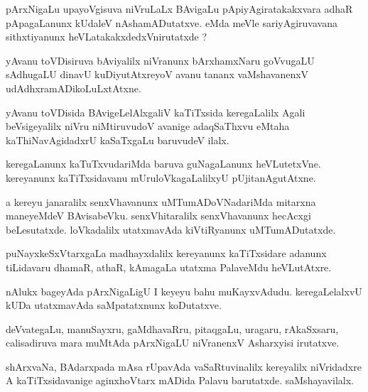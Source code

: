\documentclass{article}
\begin{document}
\begin{mn}%
pArxNigaLu upayoVgisuva niVruLaLx BAvigaLu pApiyAgiratakakxvara adhaR pApagaLanunx kUdaleV 
nAshamADutatxve. eMda meVle sariyAgiruvavana sithxtiyanunx heVLatakakxdedxVnirutatxde ?
\end{mn}

\begin{mn}%
yAvanu toVDisiruva bAviyalilx niVranunx bArxhamxNaru goVvugaLU sAdhugaLU dinavU kuDiyutAtxreyoV avanu 
tananx vaMshavanenxV udAdhxramADikoLuLxtAtxne.
\end{mn}

\begin{mn}%
yAvanu toVDisida BAvigeLelAlxgaliV kaTiTxsida keregaLalilx Agali beVsigeyalilx niVru niMtiruvudoV 
avanige adaqSaThxvu eMtaha kaThiNavAgidadxrU kaSaTxgaLu baruvudeV ilalx.
\end{mn}

\begin{mn}%
keregaLanunx kaTuTxvudariMda baruva guNagaLanunx heVLutetxVne. kereyanunx kaTiTxsidavanu 
mUruloVkagaLalilxyU pUjitanAgutAtxne.
\end{mn}

\begin{mn}%
a kereyu janaralilx senxVhavanunx uMTumADoVNadariMda mitarxna maneyeMdeV BAvisabeVku. 
senxVhitaralilx senxVhavanunx hecAcxgi beLesutatxde. loVkadalilx utatxmavAda kiVtiRyanunx 
uMTumADutatxde.
\end{mn}

\begin{mn}%
puNayxkeSxVtarxgaLa madhayxdalilx kereyanunx kaTiTxsidare adanunx tiLidavaru dhamaR, athaR, kAmagaLa 
utatxma PalaveMdu heVLutAtxre.
\end{mn}

\begin{mn}%
nAlukx bageyAda pArxNigaLigU I keyeyu bahu muKayxvAdudu. keregaLelalxvU kUDa utatxmavAda 
saMpatatxnunx koDutatxve.
\end{mn}

\begin{mn}%
deVvategaLu, manuSayxru, gaMdhavaRru, pitaqgaLu, uragaru, rAkaSxsaru, calisadiruva mara muMtAda 
pArxNigaLU niVranenxV Asharxyisi irutatxve.
\end{mn}

\begin{mn}%
shArxvaNa, BAdarxpada mAsa rUpavAda vaSaRtuvinalilx kereyalilx niVridadxre A kaTiTxsidavanige 
aginxhoVtarx mADida Palavu barutatxde. saMshayavilalx.
\end{mn}
\end{document}
